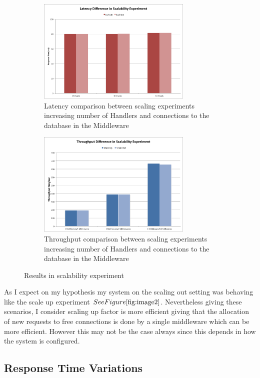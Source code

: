  \begin{figure}[h]
  
 \begin{subfigure}{0.5\textwidth}
 \includegraphics[width=0.9\linewidth, height=5cm]{scalRP.png} 
 \caption{Latency comparison between scaling experiments increasing number of Handlers and connections to the database in the Middleware}
 \label{fig:subim1}
 \end{subfigure}
 \begin{subfigure}{0.5\textwidth}
 \includegraphics[width=0.9\linewidth, height=5cm]{scalTHR.png}
 \caption{Throughput comparison between scaling experiments increasing number of Handlers and connections to the database in the Middleware}
 \label{fig:subim2}
 \end{subfigure}
  
 \caption{Results in scalability experiment}
 \label{fig:image2}
 \end{figure}
As I expect on my hypothesis my system on the scaling out setting was behaving like the scale up experiment \(See Figure \ref{fig:image2}\). Nevertheless giving these scenarios, I consider scaling up factor is more efficient giving that the allocation of new requests to free connections is done by a single middleware which can be more efficient. However this may not be the case always since this depends in how the system is configured.\\

\subsection{Response Time Variations}\label{sec:response-time-variations}

